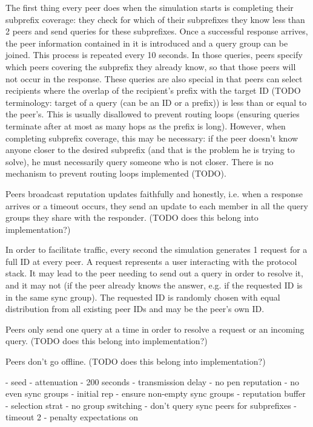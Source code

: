 The first thing every peer does when the simulation starts is completing their
subprefix coverage: they check for which of their subprefixes they know less
than 2 peers and send queries for these subprefixes. Once a successful response
arrives, the peer information contained in it is introduced and a query group
can be joined. This process is repeated every 10 seconds. In those queries,
peers specify which peers covering the subprefix they already know, so that
those peers will not occur in the response.  These queries are also special in
that peers can select recipients where the overlap of the recipient's prefix
with the target ID (TODO terminology: target of a query (can be an ID or a
prefix)) is less than or equal to the peer's. This is usually disallowed to
prevent routing loops (ensuring queries terminate after at most as many hops as
the prefix is long). However, when completing subprefix coverage, this may be
necessary: if the peer doesn't know anyone closer to the desired subprefix (and
that is the problem he is trying to solve), he must necessarily query someone
who is not closer. There is no mechanism to prevent routing loops implemented
(TODO).

Peers broadcast reputation updates faithfully and honestly, i.e. when a response
arrives or a timeout occurs, they send an update to each member in all the query
groups they share with the responder. (TODO does this belong into
implementation?)

In order to facilitate traffic, every second the simulation generates 1 request
for a full ID at every peer. A request represents a user interacting with the
protocol stack. It may lead to the peer needing to send out a query in order to
resolve it, and it may not (if the peer already knows the answer, e.g. if the
requested ID is in the same sync group). The requested ID is randomly chosen
with equal distribution from all existing peer IDs and may be the peer's own ID.

Peers only send one query at a time in order to resolve a request or an incoming
query. (TODO does this belong into implementation?)

Peers don't go offline. (TODO does this belong into implementation?)

- seed
- attenuation
- 200 seconds
- transmission delay
- no pen reputation
- no even sync groups
- initial rep
- ensure non-empty sync groups
- reputation buffer
- selection strat
- no group switching
- don't query sync peers for subprefixes
- timeout 2
- penalty expectations on
